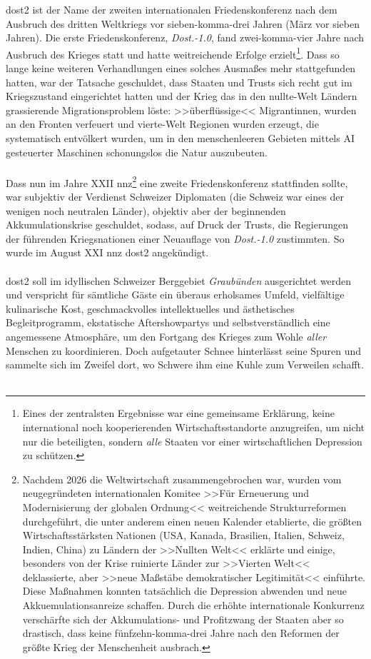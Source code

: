 \ac{dost2} ist der Name der zweiten internationalen
Friedenskonferenz nach dem Ausbruch des dritten Weltkriegs vor sieben-komma-drei
Jahren (März vor sieben Jahren).
Die erste Friedenskonferenz, \emph{Dost.-1.0}, fand zwei-komma-vier Jahre nach
Ausbruch des Krieges statt und hatte weitreichende Erfolge erzielt\footnote{
  Eines der zentralsten Ergebnisse war eine gemeinsame Erklärung, keine
  international noch kooperierenden Wirtschaftsstandorte anzugreifen, um nicht
  nur die beteiligten, sondern \emph{alle} Staaten vor einer wirtschaftlichen
  Depression zu schützen.
}.
Dass so lange keine weiteren Verhandlungen eines solches Ausmaßes mehr
stattgefunden hatten, war der Tatsache geschuldet, dass Staaten und Trusts sich
recht gut im Kriegszustand eingerichtet hatten und der Krieg das in den
nullte-Welt Ländern grassierende Migrationsproblem löste: >>überflüssige<<
Migrantinnen, wurden an den Fronten verfeuert und vierte-Welt Regionen wurden
erzeugt, die systematisch entvölkert wurden, um in den menschenleeren Gebieten
mittels AI gesteuerter Maschinen schonungslos die Natur auszubeuten.\\\\
Dass nun im Jahre XXII \ac{nnz}\footnote{
  Nachdem 2026 die Weltwirtschaft zusammengebrochen war, wurden vom
  neugegründeten internationalen Komitee >>Für Erneuerung und Modernisierung der
  globalen Ordnung<< weitreichende Strukturreformen durchgeführt, die
  unter anderem einen neuen Kalender etablierte, die größten
  Wirtschaftsstärksten Nationen (USA, Kanada, Brasilien, Italien, Schweiz,
  Indien, China) zu Ländern der >>Nullten Welt<< erklärte und einige, besonders
  von der Krise ruinierte Länder zur >>Vierten Welt<< deklassierte, aber >>neue
  Maßstäbe demokratischer Legitimität<< einführte.
  Diese Maßnahmen konnten tatsächlich die Depression abwenden und neue
  Akkuemulationsanreize schaffen. 
  Durch die erhöhte internationale Konkurrenz verschärfte sich der
  Akkumulations- und Profitzwang der Staaten aber so drastisch, dass keine
  fünfzehn-komma-drei Jahre nach den Reformen der größte Krieg der Menschenheit
  ausbrach.
} eine zweite Friedenskonferenz stattfinden sollte, war subjektiv der Verdienst
Schweizer Diplomaten (die Schweiz war eines der wenigen noch neutralen Länder),
objektiv aber der beginnenden Akkumulationskrise geschuldet, sodass, auf Druck
der Trusts, die Regierungen der führenden Kriegsnationen einer Neuauflage von
\emph{Dost.-1.0} zustimmten. 
So wurde im August XXI \ac{nnz} \ac{dost2} angekündigt.\\\\
\ac{dost2} soll im idyllischen Schweizer Berggebiet \emph{Graubünden} ausgerichtet
werden und verspricht für sämtliche Gäste ein überaus erholsames Umfeld,
vielfältige kulinarische Kost, geschmackvolles intellektuelles und
ästhetisches Begleitprogramm, ekstatische Aftershowpartys und
selbstverständlich eine angemessene Atmosphäre, um den Fortgang des Krieges zum
Wohle \emph{aller} Menschen zu koordinieren. Doch aufgetauter Schnee hinterlässt
seine Spuren und sammelte sich im Zweifel dort, wo Schwere ihm eine Kuhle zum
Verweilen schafft.\\\\
%
\vspace{1.5cm}

